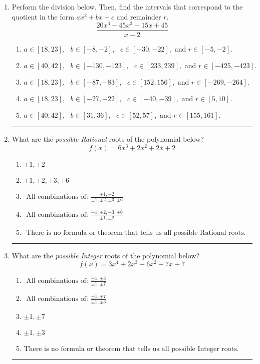 \documentclass[14pt]{extbook}
\newcommand{\litem}[1]{\item#1\hspace*{-1cm}\rule{\textwidth}{0.4pt}}
\begin{document}
\begin{enumerate}
{\begin{enumerate}[label=\Alph*.]
\end{enumerate} }
\litem{
Perform the division below. Then, find the intervals that correspond to the quotient in the form $ax^2+bx+c$ and remainder $r$.\[ \frac{20x^{3} -45 x^{2} -15 x + 45}{x -2} \]\begin{enumerate}[label=\Alph*.]
\item \( a \in [18, 23], \text{   } b \in [-8, -2], \text{   } c \in [-30, -22], \text{   and   } r \in [-5, -2]. \)
\item \( a \in [40, 42], \text{   } b \in [-130, -123], \text{   } c \in [233, 239], \text{   and   } r \in [-425, -423]. \)
\item \( a \in [18, 23], \text{   } b \in [-87, -83], \text{   } c \in [152, 156], \text{   and   } r \in [-269, -264]. \)
\item \( a \in [18, 23], \text{   } b \in [-27, -22], \text{   } c \in [-40, -39], \text{   and   } r \in [5, 10]. \)
\item \( a \in [40, 42], \text{   } b \in [31, 36], \text{   } c \in [52, 57], \text{   and   } r \in [155, 161]. \)

\end{enumerate} }
\litem{
What are the \textit{possible Rational} roots of the polynomial below?\[ f(x) = 6x^{3} +2 x^{2} +2 x + 2 \]\begin{enumerate}[label=\Alph*.]
\item \( \pm 1,\pm 2 \)
\item \( \pm 1,\pm 2,\pm 3,\pm 6 \)
\item \( \text{ All combinations of: }\frac{\pm 1,\pm 2}{\pm 1,\pm 2,\pm 3,\pm 6} \)
\item \( \text{ All combinations of: }\frac{\pm 1,\pm 2,\pm 3,\pm 6}{\pm 1,\pm 2} \)
\item \( \text{ There is no formula or theorem that tells us all possible Rational roots.} \)

\end{enumerate} }
\litem{
What are the \textit{possible Integer} roots of the polynomial below?\[ f(x) = 3x^{4} +2 x^{3} +6 x^{2} +7 x + 7 \]\begin{enumerate}[label=\Alph*.]
\item \( \text{ All combinations of: }\frac{\pm 1,\pm 3}{\pm 1,\pm 7} \)
\item \( \text{ All combinations of: }\frac{\pm 1,\pm 7}{\pm 1,\pm 3} \)
\item \( \pm 1,\pm 7 \)
\item \( \pm 1,\pm 3 \)
\item \( \text{There is no formula or theorem that tells us all possible Integer roots.} \)

\end{enumerate} }
\end{enumerate}
\end{document}

